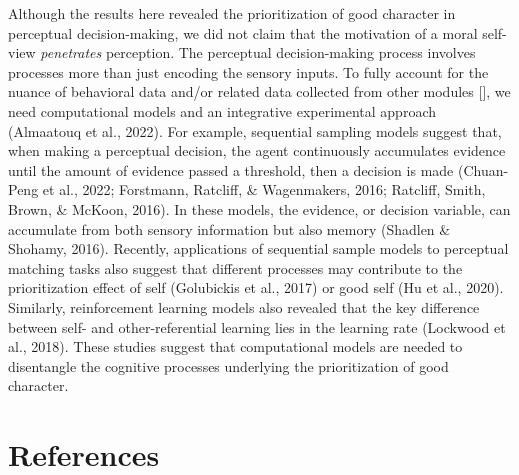\documentclass[
  man]{apa6}
\begin{document}
Although the results here revealed the prioritization of good character in perceptual decision-making, we did not claim that the motivation of a moral self-view \emph{penetrates} perception. The perceptual decision-making process involves processes more than just encoding the sensory inputs. To fully account for the nuance of behavioral data and/or related data collected from other modules {[}{]}, we need computational models and an integrative experimental approach (Almaatouq et al., 2022). For example, sequential sampling models suggest that, when making a perceptual decision, the agent continuously accumulates evidence until the amount of evidence passed a threshold, then a decision is made (Chuan-Peng et al., 2022; Forstmann, Ratcliff, \& Wagenmakers, 2016; Ratcliff, Smith, Brown, \& McKoon, 2016). In these models, the evidence, or decision variable, can accumulate from both sensory information but also memory (Shadlen \& Shohamy, 2016). Recently, applications of sequential sample models to perceptual matching tasks also suggest that different processes may contribute to the prioritization effect of self (Golubickis et al., 2017) or good self (Hu et al., 2020). Similarly, reinforcement learning models also revealed that the key difference between self- and other-referential learning lies in the learning rate (Lockwood et al., 2018). These studies suggest that computational models are needed to disentangle the cognitive processes underlying the prioritization of good character.

\hypertarget{references}{%
\section{References}\label{references}}

\begingroup
\setlength{\parindent}{-0.5in}
\setlength{\leftskip}{0.5in}
\end{document}
